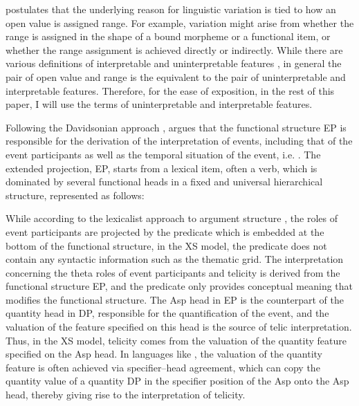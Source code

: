 \documentclass[output=paper]{langsci/langscibook}
\begin{document}
\textcite{Borer2005a,Borer2005b,Borer2013} postulates that the underlying reason
for linguistic variation is tied to how an open value is assigned range. For
example, variation might arise from whether the range is assigned in the shape
of a bound morpheme or a functional item, or whether the range assignment is
achieved directly or indirectly. While there are various definitions of
interpretable and uninterpretable features \citep[cf.][]{PesTor2004}, in
general the pair of open value and range is the equivalent to the pair of
uninterpretable and interpretable features. Therefore, for the ease of
exposition, in the rest of this paper, I will use the terms of uninterpretable
and interpretable features.

Following the Davidsonian approach
\citep{davidson1967logical,davidson1980essays,Parsons1990},\linebreak \textcite{Borer2005a}
argues that the functional structure EP is responsible for the derivation of
the interpretation of events, including that of the event participants as well
as the temporal situation of the event, i.e.  . The extended
projection, EP, starts from a lexical item, often a verb, which is dominated by
several functional heads in a fixed and universal hierarchical structure,
represented as follows:\largerpage[-1]

\begin{exe}
\ex
{}
\end{exe}

While according to the lexicalist approach to argument structure
\citep[cf.][]{Chomsky1970,Reinhart2002}, the roles of event participants are
projected by the predicate which is embedded at the bottom of the functional
structure, in the XS model, the predicate does not contain any syntactic
information such as the thematic grid. The interpretation concerning the theta
roles of event participants and telicity is derived from the functional
structure EP, and the predicate only provides conceptual meaning that modifies
the functional structure. The Asp head in EP is the counterpart of the
quantity head in DP, responsible for the quantification of the event, and the
valuation of the feature specified on this head is the source of telic
interpretation. Thus, in the XS model, telicity comes from the valuation of the
quantity feature specified on the Asp head. In languages like , the
valuation of the quantity feature is often achieved via specifier--head
agreement, which can copy the quantity value of a quantity DP in the specifier
position of the Asp onto the Asp head, thereby giving rise to the
interpretation of telicity.
\end{document}
